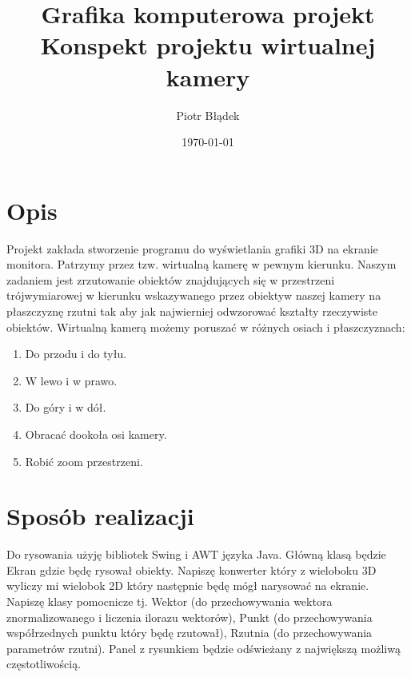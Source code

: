 \documentclass[a4paper,11pt,notitlepage]{article}
\author{Piotr Błądek}
\title{Grafika komputerowa projekt \\ Konspekt projektu wirtualnej kamery}
\date{\today}
\begin{document}
\maketitle

\section{Opis}

Projekt zakłada stworzenie programu do wyświetlania grafiki 3D na ekranie monitora. Patrzymy przez tzw. wirtualną kamerę w pewnym kierunku. Naszym zadaniem jest zrzutowanie obiektów znajdujących się w przestrzeni trójwymiarowej w kierunku wskazywanego przez obiektyw naszej kamery na płaszczyznę rzutni tak aby jak najwierniej odwzorować kształty rzeczywiste obiektów. Wirtualną kamerą możemy poruszać w różnych osiach i płaszczyznach:

\begin{enumerate}
\item Do przodu i do tyłu.
\item W lewo i w prawo.
\item Do góry i w dół.
\item Obracać dookoła osi kamery.
\item Robić zoom przestrzeni.
\end{enumerate}

\section{Sposób realizacji}

Do rysowania użyję bibliotek Swing i AWT języka Java. Główną klasą będzie Ekran gdzie będę rysował obiekty. Napiszę konwerter który z wieloboku 3D wyliczy mi wielobok 2D który następnie będę mógł narysować na ekranie. Napiszę klasy pomocnicze tj. Wektor (do przechowywania wektora znormalizowanego i liczenia ilorazu wektorów), Punkt (do przechowywania współrzednych punktu który będę rzutował), Rzutnia (do przechowywania parametrów rzutni). Panel z rysunkiem będzie odświeżany z największą możliwą częstotliwością.
\end{document}
